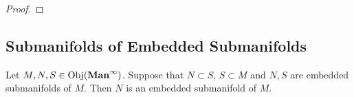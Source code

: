 \documentclass{book}
\begin{document}
	\begin{proof}
	\end{proof}
	
	
	

	
	
	
	
	
	
	
	
	
	
	
	
	
	
	
	
	
	
	
	
	
	
	
	
	
	
	
	
	
	\subsection{Submanifolds of Embedded Submanifolds}
	
	\begin{ex}  
		Let $M, N, S \in \operatorname{Obj}(\operatorname*{\text{\textbf{Man}}^{\infty}})$. Suppose that $N \subset S$, $S \subset M$ and $N, S$ are embedded submanifolds of $M$. Then $N$ is an embedded submanifold of $M$.
	\end{ex}
	
\end{document}
